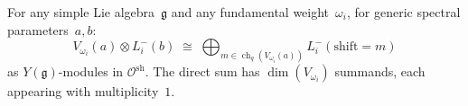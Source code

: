 \begin{theorem}
\label{thm:mc3-arbitrary-type}%
\label{thm:categorical-cg-all-types}%
%
%
%
For any simple Lie algebra~$\mathfrak{g}$ and any fundamental
weight~$\omega_i$, for generic spectral parameters~$a,b$:
\begin{equation}\label{eq:prefundamental-cg-general-type}
 V_{\omega_i}(a) \otimes L^-_{i}(b)
 \;\cong\;
 \bigoplus_{m \in \operatorname{ch}_q(V_{\omega_i}(a))}
 L^-_{i}(\mathrm{shift} = m)
\end{equation}
as $Y(\mathfrak{g})$-modules in
$\mathcal{O}^{\mathrm{sh}}$. The direct sum has
$\dim(V_{\omega_i})$ summands, each appearing with
multiplicity~$1$.
\end{theorem}

